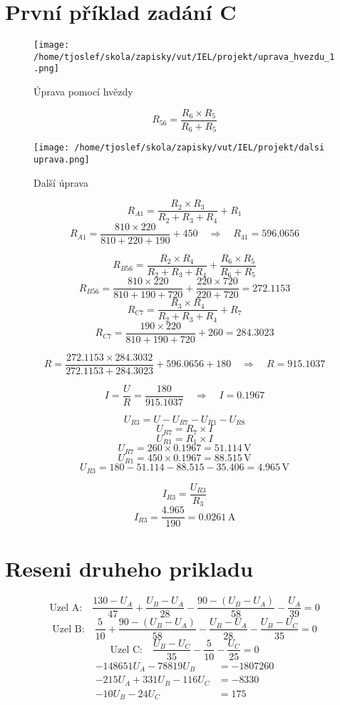 \documentclass{article}
\begin{document}
\sloppy

\section{První příklad zadání C}

\begin{figure}[!ht]
  \centering
  \texttt{[image: /home/tjoslef/skola/zapisky/vut/IEL/projekt/uprava\_hvezdu\_1.png]}
  \caption{Úprava pomocí hvězdy}
  \label{fig:hvezda}
\end{figure}

\[
    R_{56} = \frac{R_6 \times R_5}{R_6 + R_5}
\]

\begin{figure}[!ht]
  \centering
  \texttt{[image: /home/tjoslef/skola/zapisky/vut/IEL/projekt/dalsi uprava.png]}
  \caption{Další úprava}
  \label{fig:dalsi_uprava}
\end{figure}

\[
R_{A1} = \frac{R_2 \times R_3}{R_2 + R_3 + R_4} + R_1
\]
\[
    R_{A1} = \frac{810 \times 220}{810 + 220 + 190} + 450 \quad \Rightarrow \quad R_{41} = 596.0656
\]

\[
R_{B56} = \frac{R_2 \times R_4}{R_2 + R_3 + R_4} + \frac{R_6 \times R_5}{R_6 + R_5}
\]
\[
R_{B56} = \frac{810 \times 220}{810 + 190 + 720} + \frac{220 \times 720}{220 + 720}
= 272.1153
\]
\[
R_{C7} = \frac{R_3 \times R_4}{R_2 + R_3 + R_4} + R_7
\]
\[
R_{C7} = \frac{190 \times 220}{810 + 190 + 720} + 260 = 284.3023
\]

\[
R  = \frac{272.1153 \times 284.3032}{272.1153 + 284.3023} + 596.0656 + 180 \quad \Rightarrow \quad R = 915.1037
\]

\[
I = \frac{U}{R} = \frac{180}{915.1037} \quad \Rightarrow \quad I = 0.1967
\]

\[
    U_{R3} = U - U_{R7} - U_{R1} - U_{R8}
\]
\[
U_{R7} = R_7 \times I
\]
\[
    U_{R1} = R_1 \times I
\]
\[
U_{R7} = 260 \times 0.1967 = 51.114 \, \text{V}
\]
\[
    U_{R1} = 450 \times 0.1967 = 88.515 \, \text{V}
\]
\[
U_{R3}  = 180 - 51.114 - 88.515 - 35.406  = 4.965 \, \text{V}
\]

\[
I_{R3} = \frac{U_{R3}}{R_3}
\]
\[
I_{R3} = \frac{4.965}{190} = 0.0261 \, \text{A}
\]

\clearpage
\section{Reseni druheho prikladu}
\[
    \text{Uzel A:} \quad \frac{130 - U_A}{47} + \frac{U_B -U_A}{28} - \frac{90 - (U_B - U_A)}{58} - \frac{U_A}{39} = 0
\]
\[
    \text{Uzel B:} \quad \frac{5}{10} + \frac{90 - (U_B - U_A)}{58} - \frac{U_B - U_A}{28} - \frac{U_B -U_C}{35} = 0
\]
\[
    \text{Uzel C:} \quad \frac{U_B - U_C}{35} - \frac{5}{10} - \frac{U_C}{25} = 0
\]
\begin{align*}
    -148651U_A - 78819U_B &= -1807260 \\
    -215U_A + 331U_B - 116U_C &= -8330 \\
    -10U_B - 24U_C &= 175
\end{align*}
\end{document}
